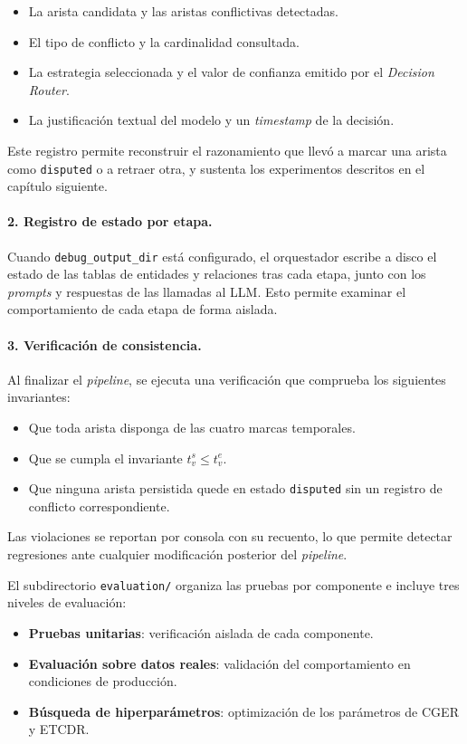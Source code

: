 \begin{itemize}
  \item La arista candidata y las aristas conflictivas detectadas.
  \item El tipo de conflicto y la cardinalidad consultada.
  \item La estrategia seleccionada y el valor de confianza emitido por el \emph{Decision Router}.
  \item La justificación textual del modelo y un \emph{timestamp} de la decisión.
\end{itemize}

Este registro permite reconstruir el razonamiento que llevó a marcar una arista como \texttt{disputed} o a retraer otra, y sustenta los experimentos descritos en el capítulo siguiente.

\paragraph{2. Registro de estado por etapa.}
Cuando \texttt{debug\_output\_dir} está configurado, el orquestador escribe a disco el estado de las tablas de entidades y relaciones tras cada etapa, junto con los \emph{prompts} y respuestas de las llamadas al LLM. Esto permite examinar el comportamiento de cada etapa de forma aislada.

\paragraph{3. Verificación de consistencia.}
Al finalizar el \emph{pipeline}, se ejecuta una verificación que comprueba los siguientes invariantes:

\begin{itemize}
  \item Que toda arista disponga de las cuatro marcas temporales.
  \item Que se cumpla el invariante $t_v^s \leq t_v^e$.
  \item Que ninguna arista persistida quede en estado \texttt{disputed} sin un registro de conflicto correspondiente.
\end{itemize}

Las violaciones se reportan por consola con su recuento, lo que permite detectar regresiones ante cualquier modificación posterior del \emph{pipeline}.

El subdirectorio \texttt{evaluation/} organiza las pruebas por componente e incluye tres niveles de evaluación:

\begin{itemize}
  \item \textbf{Pruebas unitarias}: verificación aislada de cada componente.
  \item \textbf{Evaluación sobre datos reales}: validación del comportamiento en condiciones de producción.
  \item \textbf{Búsqueda de hiperparámetros}: optimización de los parámetros de CGER y ETCDR.
\end{itemize}

